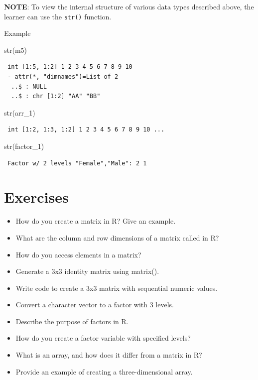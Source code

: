 \documentclass[
  letterpaper,
  DIV=11,
  numbers=noendperiod]{scrreprt}
\newenvironment{Shaded}{\begin{snugshade}}{\end{snugshade}}
\newcommand{\FunctionTok}[1]{\textcolor[rgb]{0.28,0.35,0.67}{#1}}
\newcommand{\NormalTok}[1]{\textcolor[rgb]{0.00,0.23,0.31}{#1}}
\begin{document}
\textbf{NOTE}: To view the internal structure of various data types
described above, the learner can use the \texttt{str()} function.

Example

\begin{Shaded}
\begin{Highlighting}[]
\FunctionTok{str}\NormalTok{(m5)}
\end{Highlighting}
\end{Shaded}

\begin{verbatim}
 int [1:5, 1:2] 1 2 3 4 5 6 7 8 9 10
 - attr(*, "dimnames")=List of 2
  ..$ : NULL
  ..$ : chr [1:2] "AA" "BB"
\end{verbatim}

\begin{Shaded}
\begin{Highlighting}[]
\FunctionTok{str}\NormalTok{(arr\_1)}
\end{Highlighting}
\end{Shaded}

\begin{verbatim}
 int [1:2, 1:3, 1:2] 1 2 3 4 5 6 7 8 9 10 ...
\end{verbatim}

\begin{Shaded}
\begin{Highlighting}[]
\FunctionTok{str}\NormalTok{(factor\_1)}
\end{Highlighting}
\end{Shaded}

\begin{verbatim}
 Factor w/ 2 levels "Female","Male": 2 1
\end{verbatim}

\section{Exercises}\label{exercises-10}

\begin{itemize}
\item
  How do you create a matrix in R? Give an example.
\item
  What are the column and row dimensions of a matrix called in R?
\item
  How do you access elements in a matrix?
\item
  Generate a 3x3 identity matrix using matrix().
\item
  Write code to create a 3x3 matrix with sequential numeric values.
\item
  Convert a character vector to a factor with 3 levels.
\item
  Describe the purpose of factors in R.
\item
  How do you create a factor variable with specified levels?
\item
  What is an array, and how does it differ from a matrix in R?
\item
  Provide an example of creating a three-dimensional array.
\end{itemize}
\end{document}
